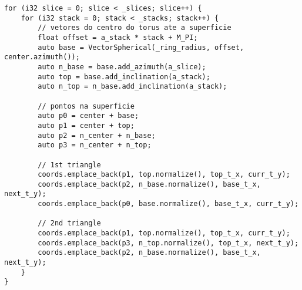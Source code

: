 \begin{lstlisting}
for (i32 slice = 0; slice < _slices; slice++) {
    for (i32 stack = 0; stack < _stacks; stack++) {
        // vetores do centro do torus ate a superficie
        float offset = a_stack * stack + M_PI;
        auto base = VectorSpherical(_ring_radius, offset, center.azimuth());
        auto n_base = base.add_azimuth(a_slice);
        auto top = base.add_inclination(a_stack);
        auto n_top = n_base.add_inclination(a_stack);

        // pontos na superficie
        auto p0 = center + base;
        auto p1 = center + top;
        auto p2 = n_center + n_base;
        auto p3 = n_center + n_top;

        // 1st triangle
        coords.emplace_back(p1, top.normalize(), top_t_x, curr_t_y);
        coords.emplace_back(p2, n_base.normalize(), base_t_x, next_t_y);
        coords.emplace_back(p0, base.normalize(), base_t_x, curr_t_y);

        // 2nd triangle
        coords.emplace_back(p1, top.normalize(), top_t_x, curr_t_y);
        coords.emplace_back(p3, n_top.normalize(), top_t_x, next_t_y);
        coords.emplace_back(p2, n_base.normalize(), base_t_x, next_t_y);
    }
}
\end{lstlisting}
